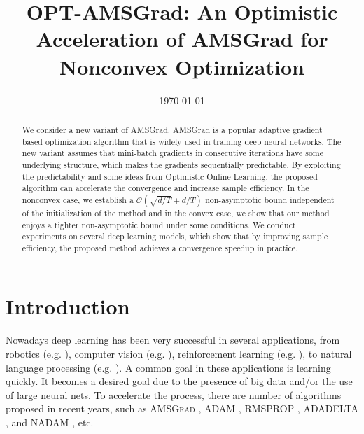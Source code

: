 \documentclass[11pt]{article}
\theoremstyle{k}
\begin{document}
\title{OPT-AMSGrad: An Optimistic Acceleration of AMSGrad for Nonconvex Optimization}
\date{\today}

\maketitle


\begin{abstract}
We consider a new variant of AMSGrad. 
AMSGrad \cite{RKK18} is a popular adaptive gradient based optimization algorithm that is widely used in training deep neural networks. 
The new variant assumes that mini-batch gradients in consecutive iterations have some underlying structure, which makes the gradients sequentially predictable. 
By exploiting the predictability and some ideas from Optimistic Online Learning, the proposed algorithm can accelerate the convergence and increase sample efficiency.
In the nonconvex case, we establish a $\mathcal{O}\left(\sqrt{d/T} +d/T \right)$ non-asymptotic bound independent of the initialization of the method and in the convex case, we show that our method enjoys a tighter non-asymptotic bound under some conditions.
We conduct experiments on several deep learning models, which show that by improving sample efficiency, the proposed method achieves a convergence speedup in practice.
\end{abstract}

\section{Introduction}

Nowadays deep learning has been very successful in several applications, from 
robotics (e.g. \cite{LFDA17}), 
computer vision (e.g. \cite{Rnet16,goodfellow2014generative}),
reinforcement learning (e.g. \cite{Atari13}),
to 
natural language processing (e.g. \cite{GMH13}).
A common goal in these applications is learning quickly.
It becomes a desired goal 
due to the presence of big data and/or the use of large neural nets.
To accelerate the process, there are number of algorithms proposed in recent years, such as 
\textsc{AMSGrad} \cite{RKK18}, 
\textsc{ADAM} \cite{KB15}, \textsc{RMSPROP} \cite{TH12}, \textsc{ADADELTA} \cite{Z12}, and \textsc{NADAM} \cite{D16}, etc.
\end{document}
